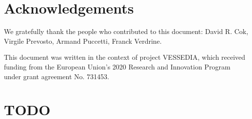 \documentclass[web]{frama-c-book}
\begin{document}
\section*{Acknowledgements}

We gratefully thank the people who contributed to this document:
David R. Cok, Virgile Prevosto, Armand Puccetti, Franck Verdrine.

This document was written in the context of project VESSEDIA,
which received funding from the European Union's 2020
Research and Innovation Program under grant agreement
No. 731453.













\appendix



\section*{TODO}
\end{document}

